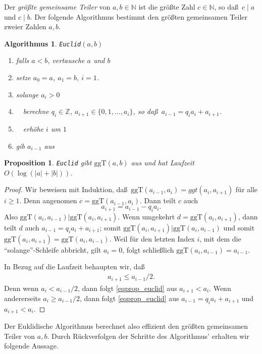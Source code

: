 \documentclass[10pt,reqno]{amsart}
\numberwithin{equation}{section}
\newcommand\ggt{\ggT}
\newcommand\ggT{\mathrm{ggT}}
\newcommand\NN{\mathbb N}
\newcommand\ZZ{\mathbb Z}
\newtheorem{proposition}[definition]{Proposition}
\newtheorem{algorithm}[definition]{Algorithmus}
\begin{document}
Der {\em gr\"o\ss te gemeinsame Teiler} von $a,b\in\NN$ ist die gr\"o\ss te Zahl $c\in\NN$, so da\ss\ $c\mid a$ und $c\mid b$.
Der folgende Algorithmus bestimmt den gr\"o\ss ten gemeinsamen Teiler zweier Zahlen $a,b$.

\begin{algorithm}
	{\tt Euclid}$(a,b)$
	\begin{enumerate}
		\item falls $a<b$, vertausche $a$ und $b$
		\item setze $a_0=a$, $a_1=b$, $i=1$.
		\item solange $a_i>0$
		\item $\quad$berechne $q_i\in\ZZ$, $a_{i+1}\in\{0,1,\ldots,a_i\}$, so da\ss\ $a_{i-1}=q_ia_i+a_{i+1}$.
		\item $\quad$erh\"ohe $i$ um $1$
		\item gib $a_{i-1}$ aus
	\end{enumerate}
\end{algorithm}

\begin{proposition}\label{prop_euclid}
	{\tt Euclid} gibt $\ggt(a,b)$ aus und hat Laufzeit $O(\log(|a|+|b|))$.
\end{proposition}
\begin{proof}
	Wir beweisen mit Induktion, da\ss\ $\ggt(a_{i-1},a_{i})=ggt(a_{i},a_{i+1})$ f\"ur alle $i\geq1$.
	Denn angenomen $c=\ggt(a_{i-1},a_i)$.
	Dann teilt $c$ auch
		$$a_{i+1}=a_{i-1}-q_ia_i.$$
	Also $\ggt(a_i,a_{i-1})|\ggt(a_i,a_{i+1})$.
	Wenn umgekehrt $d=\ggt(a_i,a_{i+1})$, dann teilt $d$ auch $a_{i-1}=q_ia_i+a_{i+1}$; somit $\ggt(a_i,a_{i+1})|\ggt(a_i,a_{i-1})$ und somit $\ggt(a_i,a_{i+1})=\ggt(a_i,a_{i-1})$.
	Weil f\"ur den letzten Index $i$, mit dem die ``solange''-Schleife abbricht, gilt $a_i=0$, folgt schlie\ss lich $\ggt(a_i,a_{i-1})=a_{i-1}$.

	In Bezug auf die Laufzeit behaupten wir, da\ss\
	\begin{align}\label{eqprop_euclid}
		a_{i+1}\leq a_{i-1}/2.
	\end{align}
	Denn wenn $a_i<a_{i-1}/2$, dann folgt \eqref{eqprop_euclid} aus $a_{i+1}<a_i$.
	Wenn andererseits $a_i\geq a_{i-1}/2$, dann folgt \eqref{eqprop_euclid} aus $a_{i-1}=q_ia_i+a_{i+1}$ und $a_{i+1}<a_i$.
\end{proof}

Der Euklidische Algorithmus berechnet also effizient den gr\"o\ss ten gemeinsamen Teiler von $a,b$.
Durch R\"uckverfolgen der Schritte des Algorithmus' erhalten wir folgende Aussage.
\end{document}
